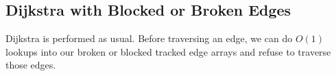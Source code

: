 \documentclass[letterpaper]{article}
\begin{document}
\subsection{Dijkstra with Blocked or Broken Edges}

Dijkstra is performed as usual. Before traversing an edge, we can do $O(1)$ lookups into our broken or blocked tracked edge arrays and refuse to traverse those edges.
\end{document}
